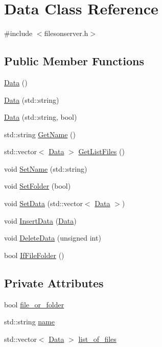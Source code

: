 \hypertarget{classData}{\section{Data Class Reference}
\label{classData}
}


{\ttfamily \#include $<$filesonserver.\-h$>$}

\subsection*{Public Member Functions}
\begin{DoxyCompactItemize}
\item 
\hyperlink{classData_af11f741cb7f587e2e495452a8905a22a}{Data} ()
\item 
\hyperlink{classData_a619cb123144821ee3cc9082a5e5e468d}{Data} (std\-::string)
\item 
\hyperlink{classData_a688594a5c977ec0d32a68a5ab8883728}{Data} (std\-::string, bool)
\item 
std\-::string \hyperlink{classData_ab68d84adc512ca2aea478881d5093bae}{Get\-Name} ()
\item 
std\-::vector$<$ \hyperlink{classData}{Data} $>$ \hyperlink{classData_aaa1badb08f8176fcfbb1e8d00e020538}{Get\-List\-Files} ()
\item 
void \hyperlink{classData_a0b60f9662dfbcbc0a61cef264ac9a3e5}{Set\-Name} (std\-::string)
\item 
void \hyperlink{classData_aa95d919311669b36d0975f86309e3d6d}{Set\-Folder} (bool)
\item 
void \hyperlink{classData_a93454afb2a531e367d02f5445d5df3b9}{Set\-Data} (std\-::vector$<$ \hyperlink{classData}{Data} $>$)
\item 
void \hyperlink{classData_a65bbf400ae788856f3619a07c66597ae}{Insert\-Data} (\hyperlink{classData}{Data})
\item 
void \hyperlink{classData_a7bf25ec1dc8ad403eb91fa07c4784e48}{Delete\-Data} (unsigned int)
\item 
bool \hyperlink{classData_a75a721fb364ed17376a02317fa87080e}{If\-File\-Folder} ()
\end{DoxyCompactItemize}
\subsection*{Private Attributes}
\begin{DoxyCompactItemize}
\item 
bool \hyperlink{classData_ae955079403d5eeb07994bb666faac1e6}{file\-\_\-or\-\_\-folder}
\item 
std\-::string \hyperlink{classData_a6286e2dc9a682048ddf557bc9126ea1b}{name}
\item 
std\-::vector$<$ \hyperlink{classData}{Data} $>$ \hyperlink{classData_a14e8995ae5e9f3384ba903abcd705ca0}{list\-\_\-of\-\_\-files}
\end{DoxyCompactItemize}


